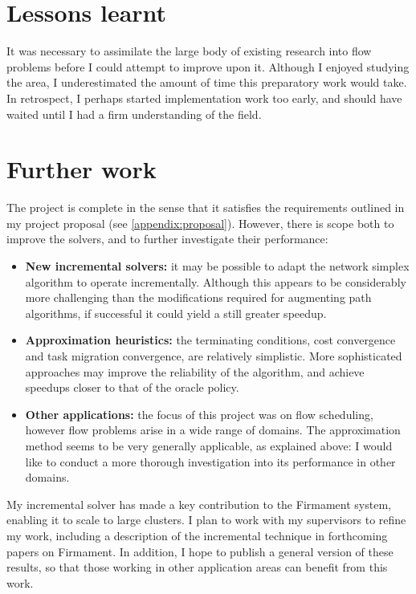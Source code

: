 \section{Lessons learnt}

It was necessary to assimilate the large body of existing research into flow problems before I could attempt to improve upon it. Although I enjoyed studying the area, I underestimated the amount of time this preparatory work would take. In retrospect, I perhaps started implementation work too early, and should have waited until I had a firm understanding of the field.

\section{Further work}

The project is complete in the sense that it satisfies the requirements outlined in my project proposal (see \cref{appendix:proposal}). However, there is scope both to improve the solvers, and to further investigate their performance:

\begin{itemize}
    \item \textbf{New incremental solvers:} it may be possible to adapt the network simplex algorithm to operate incrementally. Although this appears to be considerably more challenging than the modifications required for augmenting path algorithms, if successful it could yield a still greater speedup.
    \item \textbf{Approximation heuristics:} the terminating conditions, cost convergence and task migration convergence, are relatively simplistic. More sophisticated approaches may improve the reliability of the algorithm, and achieve speedups closer to that of the oracle policy.
    \item \textbf{Other applications:} the focus of this project was on flow scheduling, however flow problems arise in a wide range of domains. The approximation method seems to be very generally applicable, as explained above: I would like to conduct a more thorough investigation into its performance in other domains. 
\end{itemize}

My incremental solver has made a key contribution to the Firmament system, enabling it to scale to large clusters. I plan to work with my supervisors to refine my work, including a description of the incremental technique in forthcoming papers on Firmament. In addition, I hope to publish a general version of these results, so that those working in other application areas can benefit from this work.